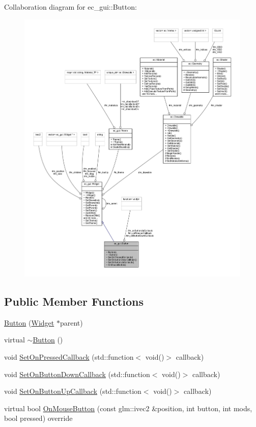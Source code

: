 Collaboration diagram for ec\+\_\+gui\+:\+:Button\+:\nopagebreak
\begin{figure}[H]
\begin{center}
\leavevmode
\includegraphics[width=350pt]{classec__gui_1_1_button__coll__graph}
\end{center}
\end{figure}
\subsection*{Public Member Functions}
\begin{DoxyCompactItemize}
\item 
\mbox{\hyperlink{classec__gui_1_1_button_a179c52041fa20bbfc088020bafc31056}{Button}} (\mbox{\hyperlink{classec__gui_1_1_widget}{Widget}} $\ast$parent)
\item 
virtual \mbox{\hyperlink{classec__gui_1_1_button_a4e6b3dc59f83c39f5f644e8040f7577f}{$\sim$\+Button}} ()
\item 
void \mbox{\hyperlink{classec__gui_1_1_button_a81c99c46bc9f747cdacdafa813f6974e}{Set\+On\+Pressed\+Callback}} (std\+::function$<$ void()$>$ callback)
\item 
void \mbox{\hyperlink{classec__gui_1_1_button_a0c8039773e843b8e6d05058969b24a23}{Set\+On\+Button\+Down\+Callback}} (std\+::function$<$ void()$>$ callback)
\item 
void \mbox{\hyperlink{classec__gui_1_1_button_a39a9d1fa701cd83ee5818df093aa1bd3}{Set\+On\+Button\+Up\+Callback}} (std\+::function$<$ void()$>$ callback)
\item 
virtual bool \mbox{\hyperlink{classec__gui_1_1_button_a9df65865d810e2ba198905cdf691f9be}{On\+Mouse\+Button}} (const glm\+::ivec2 \&position, int button, int mods, bool pressed) override
\end{DoxyCompactItemize}

